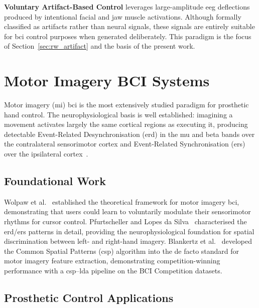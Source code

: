 \textbf{Voluntary Artifact-Based Control} leverages large-amplitude
\acrshort{eeg} deflections produced by intentional facial and jaw
muscle activations. Although formally classified as artifacts rather
than neural signals, these signals are entirely suitable for
\acrshort{bci} control purposes when generated deliberately.
This paradigm is the focus of Section~\ref{sec:rw_artifact} and
the basis of the present work.

\section{Motor Imagery BCI Systems}
\label{sec:rw_mi}

Motor imagery (\acrshort{mi}) \acrshort{bci} is the most extensively
studied paradigm for prosthetic hand control. The neurophysiological
basis is well established: imagining a movement activates largely
the same cortical regions as executing it, producing detectable
Event-Related Desynchronisation (\acrshort{erd}) in the mu and beta
bands over the contralateral sensorimotor cortex and Event-Related
Synchronisation (\acrshort{ers}) over the ipsilateral
cortex~\cite{pfurtscheller1999erd}.

\subsection{Foundational Work}

Wolpaw et al.~\cite{wolpaw2002bci} established the theoretical
framework for motor imagery \acrshort{bci}, demonstrating that users
could learn to voluntarily modulate their sensorimotor rhythms for
cursor control. Pfurtscheller and Lopes da Silva~\cite{pfurtscheller1999erd}
characterised the \acrshort{erd}/\acrshort{ers} patterns in detail,
providing the neurophysiological foundation for spatial
discrimination between left- and right-hand imagery.
Blankertz et al.~\cite{blankertz2008csp} developed the Common Spatial
Patterns (\acrshort{csp}) algorithm into the de facto standard for
motor imagery feature extraction, demonstrating competition-winning
performance with a \acrshort{csp}--\acrshort{lda} pipeline on the
BCI Competition datasets.

\subsection{Prosthetic Control Applications}

